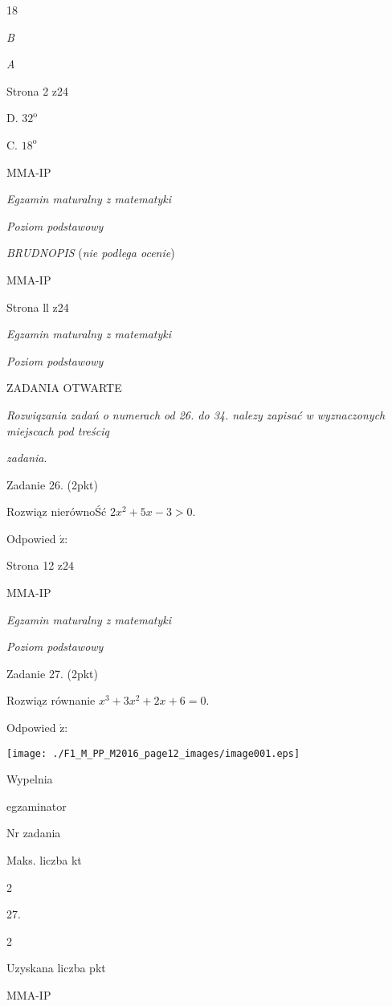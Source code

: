 \documentclass[a4paper,12pt]{article}
\begin{document}
18

{\it B}

{\it A}

Strona 2 z24

D. $32^{\mathrm{o}}$

C. $18^{\mathrm{o}}$

MMA-IP





{\it Egzamin maturalny z matematyki}

{\it Poziom podstawowy}

{\it BRUDNOPIS} ({\it nie podlega ocenie})

MMA-IP

Strona ll z24





{\it Egzamin maturalny z matematyki}

{\it Poziom podstawowy}

ZADANIA OTWARTE

{\it Rozwiqzania zadań o numerach od 26. do 34. nalezy zapisać w wyznaczonych miejscach pod treściq}

{\it zadania}.

Zadanie 26. (2pkt)

Rozwiąz nierównoŚć $2x^{2}+5x-3>0.$

Odpowied $\acute{\mathrm{z}}$:

Strona 12 $\mathrm{z}24$

MMA-IP





{\it Egzamin maturalny z matematyki}

{\it Poziom podstawowy}

Zadanie 27. (2pkt)

Rozwiąz równanie $x^{3}+3x^{2}+2x+6=0.$

Odpowied $\acute{\mathrm{z}}$:
\begin{center}
\texttt{[image: ./F1\_M\_PP\_M2016\_page12\_images/image001.eps]}
\end{center}
Wypelnia

egzaminator

Nr zadania

Maks. liczba kt

2

27.

2

Uzyskana liczba pkt

MMA-IP
\end{document}
